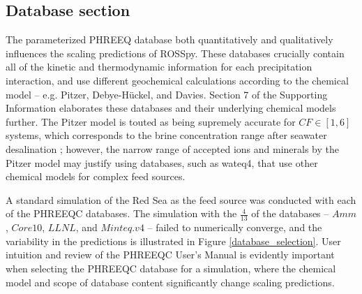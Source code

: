 \subsection{Database section}
The parameterized PHREEQ database both quantitatively and qualitatively influences the scaling predictions of ROSSpy. These databases crucially contain all of the kinetic and thermodynamic information for each precipitation interaction, and use different geochemical calculations according to the chemical model -- e.g. Pitzer, Debye-H\"uckel, and Davies. Section 7 of the Supporting Information elaborates these databases and their underlying chemical models further. The Pitzer model \cite{Pitzer1973ThermodynamicsEquations,Pitzer1974ThermodynamicsElectrolytes} is touted as being supremely accurate for $CF \in [1,6]$ systems, which corresponds to the brine concentration range after seawater desalination \cite{VandeLisdonk2001PredictionSystems,Sheikholeslami2004AssessmentUnits,Mohammad2007PredictionMembranes}; however, the narrow range of accepted ions and minerals by the Pitzer model may justify using databases, such as wateq4, that use other chemical models for complex feed sources. 

A standard simulation of the Red Sea as the feed source was conducted with each of the PHREEQC databases. The simulation with the $\frac{4}{13}$ of the databases -- $Amm$, $Core10$, $LLNL$, and $Minteq.v4$ -- failed to numerically converge, and the variability in the predictions is illustrated in Figure \ref{database_selection}. User intuition and review of the PHREEQC User's Manual is evidently important when selecting the PHREEQC database for a simulation, where the chemical model and scope of database content significantly change scaling predictions.

